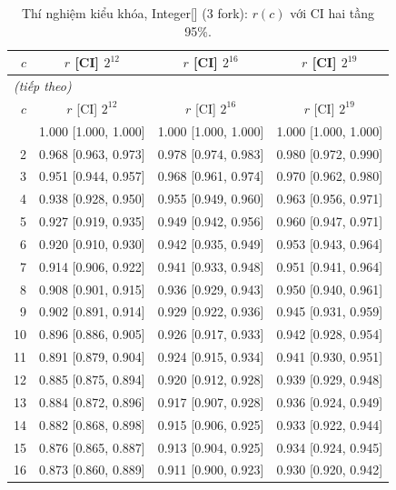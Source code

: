 \footnotesize
\begin{longtable}{rccc}
\caption{Thí nghiệm kiểu khóa, Integer[] (3 fork): $r(c)$ với CI hai tầng 95\%.}\label{tab:d3_full_integer}\\
\toprule
$c$ & $r$ [CI] $2^{12}$ & $r$ [CI] $2^{16}$ & $r$ [CI] $2^{19}$ \\
\midrule
\endfirsthead
\multicolumn{4}{l}{\textit{(tiếp theo)}}\\
\toprule
$c$ & $r$ [CI] $2^{12}$ & $r$ [CI] $2^{16}$ & $r$ [CI] $2^{19}$ \\
\midrule
\endhead
\bottomrule
\endlastfoot
1 & 1.000 [1.000, 1.000] & 1.000 [1.000, 1.000] & 1.000 [1.000, 1.000] \\
2 & 0.968 [0.963, 0.973] & 0.978 [0.974, 0.983] & 0.980 [0.972, 0.990] \\
3 & 0.951 [0.944, 0.957] & 0.968 [0.961, 0.974] & 0.970 [0.962, 0.980] \\
4 & 0.938 [0.928, 0.950] & 0.955 [0.949, 0.960] & 0.963 [0.956, 0.971] \\
5 & 0.927 [0.919, 0.935] & 0.949 [0.942, 0.956] & 0.960 [0.947, 0.971] \\
6 & 0.920 [0.910, 0.930] & 0.942 [0.935, 0.949] & 0.953 [0.943, 0.964] \\
7 & 0.914 [0.906, 0.922] & 0.941 [0.933, 0.948] & 0.951 [0.941, 0.964] \\
8 & 0.908 [0.901, 0.915] & 0.936 [0.929, 0.943] & 0.950 [0.940, 0.961] \\
9 & 0.902 [0.891, 0.914] & 0.929 [0.922, 0.936] & 0.945 [0.931, 0.959] \\
10 & 0.896 [0.886, 0.905] & 0.926 [0.917, 0.933] & 0.942 [0.928, 0.954] \\
11 & 0.891 [0.879, 0.904] & 0.924 [0.915, 0.934] & 0.941 [0.930, 0.951] \\
12 & 0.885 [0.875, 0.894] & 0.920 [0.912, 0.928] & 0.939 [0.929, 0.948] \\
13 & 0.884 [0.872, 0.896] & 0.917 [0.907, 0.928] & 0.936 [0.924, 0.949] \\
14 & 0.882 [0.868, 0.898] & 0.915 [0.906, 0.925] & 0.933 [0.922, 0.944] \\
15 & 0.876 [0.865, 0.887] & 0.913 [0.904, 0.925] & 0.934 [0.924, 0.945] \\
16 & 0.873 [0.860, 0.889] & 0.911 [0.900, 0.923] & 0.930 [0.920, 0.942] \\

\end{longtable}
